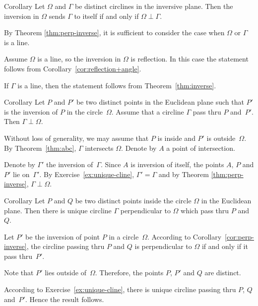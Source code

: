 \begin{thm}{Corollary}\label{cor:perp-inverse-clines}
Let $\Omega$  and $\Gamma$ be distinct circlines in the inversive plane.
Then
the inversion in $\Omega$ sends $\Gamma$ to itself if and only if $\Omega\perp\Gamma$.
\end{thm}

By Theorem \ref{thm:perp-inverse}, it is sufficient to consider the case when $\Omega$ or $\Gamma$ is a line.

Assume $\Omega$ is a line, so the inversion in $\Omega$ is reflection.
In this case the statement follows from Corollary~\ref{cor:reflection+angle}.

If $\Gamma$ is a line, 
then the statement follows from Theorem~\ref{thm:inverse}.
\qeds


\begin{thm}{Corollary}\label{cor:perp-inverse}
Let $P$ and $P'$ be two distinct points  in the Euclidean plane
such that $P'$ is the inversion of $P$ in the circle~$\Omega$.
Assume that a circline $\Gamma$ pass thru $P$ and~$P'$.
Then $\Gamma\perp\Omega$.
\end{thm}

Without loss of generality, we may assume that $P$ is inside and $P'$ is outside~$\Omega$.
By Theorem~\ref{thm:abc}, $\Gamma$ intersects $\Omega$.
Denote by $A$ a point of intersection.


Denote by $\Gamma'$ the inversion of~$\Gamma$.
Since $A$ is inversion of itself, the points $A$, $P$ and $P'$ lie on~$\Gamma'$.
By Exercise~\ref{ex:unique-cline},
$\Gamma'=\Gamma$
and
by Theorem \ref{thm:perp-inverse}, $\Gamma\perp\Omega$.
\qeds

\begin{thm}{Corollary}\label{cor:h-line} Let $P$ and $Q$ be two distinct points inside the circle $\Omega$ in the Euclidean plane.
Then there is unique circline $\Gamma$ perpendicular to $\Omega$ which pass thru $P$ and~$Q$.  
\end{thm}

Let $P'$ be the inversion of point $P$ in a circle~$\Omega$.
According to Corollary~\ref{cor:perp-inverse},
the circline passing thru $P$ and $Q$ 
is perpendicular to $\Omega$ if and only if it pass thru~$P'$.

Note that $P'$ lies outside of~$\Omega$.
Therefore, the points $P$, $P'$ and $Q$ are distinct.

According to Exercise~\ref{ex:unique-cline},
there is unique circline passing thru $P$, $Q$ and~$P'$.
Hence the result follows.
\qeds

